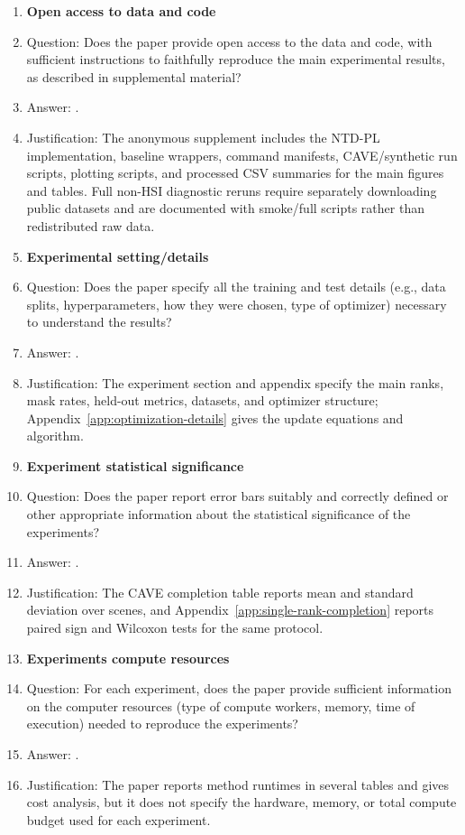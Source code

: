 \begin{enumerate}
\item {\bf Open access to data and code}
    \item[] Question: Does the paper provide open access to the data and code, with sufficient instructions to faithfully reproduce the main experimental results, as described in supplemental material?
    \item[] Answer: \answerPartial{}.
    \item[] Justification: The anonymous supplement includes the NTD-PL implementation, baseline wrappers, command manifests, CAVE/synthetic run scripts, plotting scripts, and processed CSV summaries for the main figures and tables. Full non-HSI diagnostic reruns require separately downloading public datasets and are documented with smoke/full scripts rather than redistributed raw data.

\item {\bf Experimental setting/details}
    \item[] Question: Does the paper specify all the training and test details (e.g., data splits, hyperparameters, how they were chosen, type of optimizer) necessary to understand the results?
    \item[] Answer: \answerYes{}.
    \item[] Justification: The experiment section and appendix specify the main ranks, mask rates, held-out metrics, datasets, and optimizer structure; Appendix~\ref{app:optimization-details} gives the update equations and algorithm.

\item {\bf Experiment statistical significance}
    \item[] Question: Does the paper report error bars suitably and correctly defined or other appropriate information about the statistical significance of the experiments?
    \item[] Answer: \answerYes{}.
    \item[] Justification: The CAVE completion table reports mean and standard deviation over scenes, and Appendix~\ref{app:single-rank-completion} reports paired sign and Wilcoxon tests for the same protocol.

\item {\bf Experiments compute resources}
    \item[] Question: For each experiment, does the paper provide sufficient information on the computer resources (type of compute workers, memory, time of execution) needed to reproduce the experiments?
    \item[] Answer: \answerNo{}.
    \item[] Justification: The paper reports method runtimes in several tables and gives cost analysis, but it does not specify the hardware, memory, or total compute budget used for each experiment.


\end{enumerate}
